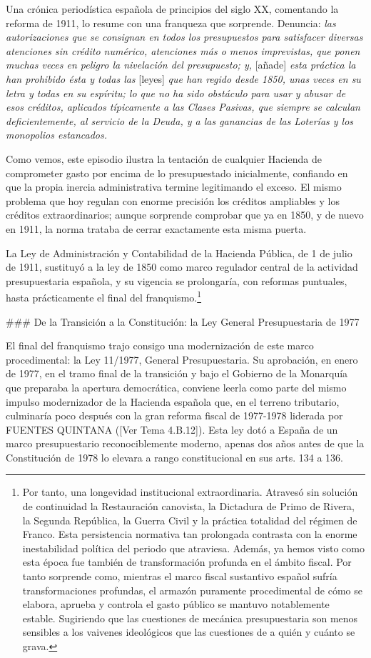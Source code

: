 \documentclass[10pt,a4paper]{article}
\newcommand{\authorfont}[1]{{\fontfamily{EBGaramond-TLF}\selectfont #1}}
\begin{document}
Una crónica periodística española de principios del siglo XX, comentando la reforma de 1911, lo resume con una franqueza que sorprende. Denuncia: \textit{las autorizaciones que se consignan en todos los presupuestos para satisfacer diversas atenciones sin crédito numérico, atenciones más o menos imprevistas, que ponen muchas veces en peligro la nivelación del presupuesto; y, }[añade]\textit{ esta práctica la han prohibido ésta y todas las }[leyes]\textit{ que han regido desde 1850, unas veces en su letra y todas en su espíritu; lo que no ha sido obstáculo para usar y abusar de esos créditos, aplicados típicamente a las Clases Pasivas, que siempre se calculan deficientemente, al servicio de la Deuda, y a las ganancias de las Loterías y los monopolios estancados.}

Como vemos, este episodio ilustra la tentación de cualquier Hacienda de comprometer gasto por encima de lo presupuestado inicialmente, confiando en que la propia inercia administrativa termine legitimando el exceso. El mismo problema que hoy regulan con enorme precisión los créditos ampliables y los créditos extraordinarios; aunque sorprende comprobar que ya en 1850, y de nuevo en 1911, la norma trataba de cerrar exactamente esta misma puerta.

La Ley de Administración y Contabilidad de la Hacienda Pública, de 1 de julio de 1911, sustituyó a la ley de 1850 como marco regulador central de la actividad presupuestaria española, y su vigencia se prolongaría, con reformas puntuales, hasta prácticamente el final del franquismo.\footnote{%
    Por tanto, una longevidad institucional extraordinaria. Atravesó sin solución de continuidad la Restauración canovista, la Dictadura de Primo de Rivera, la Segunda República, la Guerra Civil y la práctica totalidad del régimen de Franco. Esta persistencia normativa tan prolongada contrasta con la enorme inestabilidad política del periodo que atraviesa. Además, ya hemos visto como esta época fue también de transformación profunda en el ámbito fiscal. Por tanto sorprende como, mientras el marco fiscal sustantivo español sufría transformaciones profundas, el armazón puramente procedimental de cómo se elabora, aprueba y controla el gasto público se mantuvo notablemente estable. Sugiriendo que las cuestiones de mecánica presupuestaria son menos sensibles a los vaivenes ideológicos que las cuestiones de a quién y cuánto se grava.
}

### De la Transición a la Constitución: la Ley General Presupuestaria de 1977

El final del franquismo trajo consigo una modernización de este marco procedimental: la Ley 11/1977, General Presupuestaria. Su aprobación, en enero de 1977, en el tramo final de la transición y bajo el Gobierno de la Monarquía que preparaba la apertura democrática, conviene leerla como parte del mismo impulso modernizador de la Hacienda española que, en el terreno tributario, culminaría poco después con la gran reforma fiscal de 1977-1978 liderada por FUENTES QUINTANA ([\authorfont{Ver Tema 4.B.12}]). Esta ley dotó a España de un marco presupuestario reconociblemente moderno, apenas dos años antes de que la Constitución de 1978 lo elevara a rango constitucional en sus arts. 134 a 136.
\end{document}

